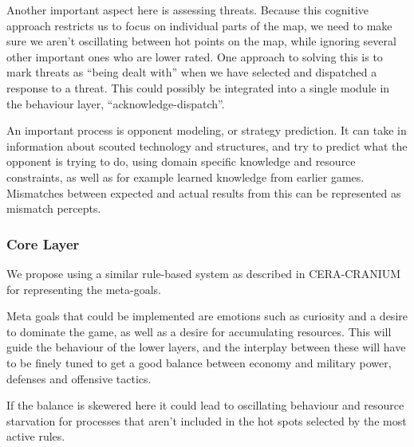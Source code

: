 Another important aspect here is assessing threats. Because this cognitive
approach restricts us to focus on individual parts of the map, we need to make
sure we aren't oscillating between hot points on the map, while ignoring
several other important ones who are lower rated. One approach to
solving this is to mark threats as ``being dealt with'' when we have selected
and dispatched a response to a threat. This could possibly be integrated into a
single module in the behaviour layer, ``acknowledge-dispatch''.

An important process is opponent modeling, or strategy prediction. It can take
in information about scouted technology and structures, and try to predict what
the opponent is trying to do, using domain specific knowledge and resource
constraints, as well as for example learned knowledge from earlier games.
Mismatches between expected and actual results from this can be represented as
mismatch percepts.

\subsubsection{Core Layer}
We propose using a similar rule-based system as described in CERA-CRANIUM for
representing the meta-goals.

Meta goals that could be implemented are emotions such as curiosity and a
desire to dominate the game, as well as a desire for accumulating resources.
This will guide the behaviour of the lower layers, and the interplay between
these will have to be finely tuned to get a good balance between economy and
military power, defenses and offensive tactics.

If the balance is skewered here it could lead to oscillating behaviour and
resource starvation for processes that aren't included in the hot spots
selected by the most active rules.